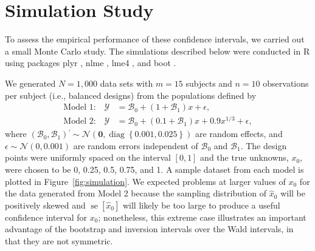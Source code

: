 \documentclass[useAMS,usenatbib,usegraphicx,referee]{biom}\usepackage[]{graphicx}\usepackage[]{color}
\newcommand{\diag}{\operatorname{diag}}
\newcommand{\se}{\operatorname{se}}
\newcommand{\trans}{\ensuremath{^\prime}}
\newcommand{\proglang}[1]{\textsf{#1}}
\newcommand{\pkg}[1]{{\fontseries{b}\selectfont #1}}
\begin{document}
\section{Simulation Study}
\label{sec:simulation}

To assess the empirical performance of these confidence intervals, we carried out a small Monte Carlo study. The simulations described below were conducted in \proglang{R} using packages \pkg{plyr} \citep{wickham_plyr_2011}, \pkg{nlme} \citep{pinheiro_nlme_2013}, \pkg{lme4} \citep{bates_lme4_2014}, and \pkg{boot} \citep{canty_boot_2013}. 

We generated $N = 1,000$ data sets with $m = 15$ subjects and $n = 10$ observations per subject (i.e., balanced designs) from the populations defined by 
\begin{align*}
  \text{Model 1:} \quad \mathscr{Y} &= \mathscr{B}_0 + (1 + \mathscr{B}_1)x + \epsilon, \\ %
  \text{Model 2:} \quad \mathscr{Y} &= \mathscr{B}_0 + (0.1 + \mathscr{B}_1)x + 0.9x^{1/3} + \epsilon, %
\end{align*}
where $\left(\mathscr{B}_0, \mathscr{B}_1\right)\trans \sim \mathcal{N}\left(\bm{0}, \diag\left\{0.001, 0.025\right\}\right)$ are random effects, and $\epsilon \sim \mathcal{N}\left(0, 0.001\right)$ are random errors independent of $\mathscr{B}_0$ and $\mathscr{B}_1$. The design points were uniformly spaced on the interval $\left[0, 1\right]$ and the true unknowns, $x_0$, were chosen to be 0, 0.25, 0.5, 0.75, and 1. A sample dataset from each model is plotted in Figure~\ref{fig:simulation}. We expected problems at larger values of $x_0$ for the data generated from Model 2 because the sampling distribution of $\widehat{x}_0$ will be positively skewed and $\se\left[\widehat{x}_0\right]$ will likely be too large to produce a useful confidence interval for $x_0$; nonetheless, this extreme case illustrates an important advantage of the bootstrap and inversion intervals over the Wald intervals, in that they are not symmetric.
\end{document}

